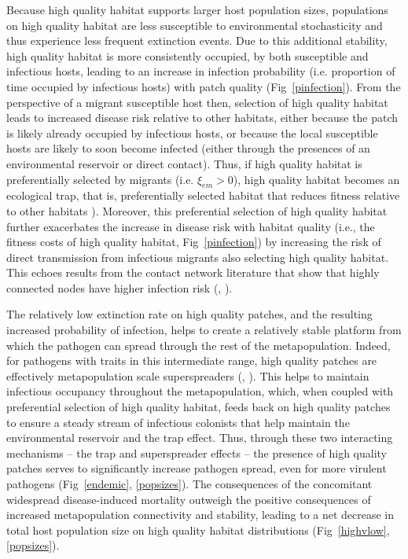 \documentclass{article}
\begin{document}
Because high quality habitat supports larger host population sizes, populations on high quality habitat are less susceptible to environmental stochasticity and thus experience less frequent extinction events.
Due to this additional stability, high quality habitat is more consistently occupied, by both susceptible and infectious hosts, leading to an increase in infection probability (i.e. proportion of time occupied by infectious hosts) with patch quality (Fig~\ref{pinfection}).
From the perspective of a migrant susceptible host then, selection of high quality habitat leads to increased disease risk relative to other habitats, either because the patch is likely already occupied by infectious hosts, or because the local susceptible hosts are likely to soon become infected (either through the presences of an environmental reservoir or direct contact).
Thus, if high quality habitat is preferentially selected by migrants (i.e. $\xi_{em} > 0$), high quality habitat becomes an ecological trap, that is, preferentially selected habitat that reduces fitness relative to other habitats \cite{Robertson2006}).
Moreover, this preferential selection of high quality habitat further exacerbates the increase in disease risk with habitat quality (i.e., the fitness costs of high quality habitat, Fig~\ref{pinfection}) by increasing the risk of direct transmission from infectious migrants also selecting high quality habitat.
This echoes results from the contact network literature that show that highly connected nodes have higher infection risk (\cite{Christley2005}, \cite{Keeling2005}).  

The relatively low extinction rate on high quality patches, and the resulting increased probability of infection, helps to create a relatively stable platform from which the pathogen can spread through the rest of the metapopulation.
Indeed, for pathogens with traits in this intermediate range, high quality patches are effectively metapopulation scale superspreaders (\cite{Lloyd-Smith2005}, \cite{Paull2012}).  
This helps to maintain infectious occupancy throughout the metapopulation, which, when coupled with preferential selection of high quality habitat, feeds back on high quality patches to ensure a steady stream of infectious colonists that help maintain the environmental reservoir and the trap effect.  
Thus, through these two interacting mechanisms -- the trap and superspreader effects -- the presence of high quality patches serves to significantly increase pathogen spread, even for more virulent pathogens (Fig~\ref{endemic}, \ref{popsizes}).
The consequences of the concomitant widespread disease-induced mortality outweigh the positive consequences of increased metapopulation connectivity and stability, leading to a net decrease in total host population size on high quality habitat distributions (Fig~\ref{highvlow}, \ref{popsizes}).  
\end{document}
